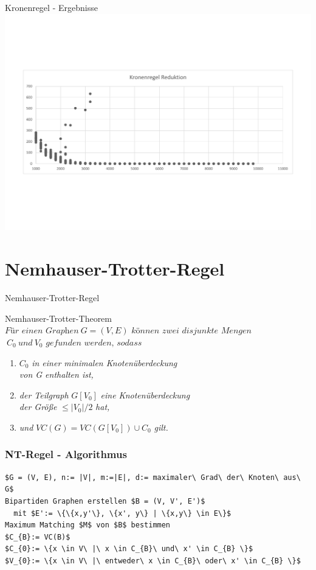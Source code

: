 \documentclass{beamer}
\begin{document}
\begin{frame}{Kronenregel - Ergebnisse}
\includegraphics[scale= .4]{analysisCrown.pdf} 
\end{frame}

\section{Nemhauser-Trotter-Regel}
	
\begin{frame}{Nemhauser-Trotter-Regel}
\begin{block}{Nemhauser-Trotter-Theorem}
$\textit{Für einen Graphen}\ G=(V,E)\textit{ können zwei disjunkte Mengen}$\\ $\ C_{0}\ und\ V_{0} \textit{ gefunden werden, sodass}$\pause
\begin{enumerate}
\item $C_{0}$ \textit{ in einer minimalen Knotenüberdeckung} \\
\textit{von G enthalten ist,}\pause
\item \textit{der Teilgraph }$G[V_{0}]$ \textit{eine Knotenüberdeckung}\\
\textit{der Größe} $\leq |V_{0}| / 2$ \textit{ hat,}\pause
\item \textit{und} $VC(G) = VC(G[V_{0}])\cup C_{0}$ \textit{ gilt.}
\end{enumerate}

\end{block}
\end{frame}
	
\begin{frame}[fragile]
\frametitle{NT-Regel - Algorithmus}
\begin{lstlisting}[mathescape = true, basicstyle=\ttfamily, escapechar = !]
$G = (V, E), n:= |V|, m:=|E|, d:= maximaler\ Grad\ der\ Knoten\ aus\ G$
Bipartiden Graphen erstellen $B = (V, V', E')$
  mit $E':= \{\{x,y'\}, \{x', y\} | \{x,y\} \in E\}$
Maximum Matching $M$ von $B$ bestimmen
$C_{B}:= VC(B)$
$C_{0}:= \{x \in V\ |\ x \in C_{B}\ und\ x' \in C_{B} \}$
$V_{0}:= \{x \in V\ |\ entweder\ x \in C_{B}\ oder\ x' \in C_{B} \}$
\end{lstlisting}

\end{frame}
\end{document}
